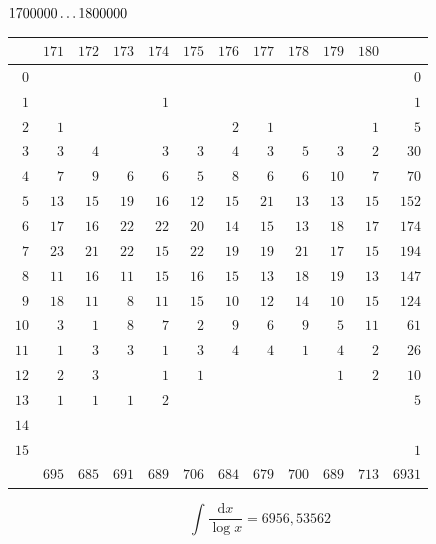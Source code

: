 \par\medskip
\noindent\begin{minipage}{\linewidth}\centering
{}
\(1700000\mathinner{.\,.\,.}1800000\)\par\smallskip
\begingroup\fontsize{10.5}{11.5}\selectfont\setlength{\tabcolsep}{3.5pt}\renewcommand{\arraystretch}{1}
\begin{tabular}{r|rrrrrrrrrr|r}\hline
 & $171$ & $172$ & $173$ & $174$ & $175$ & $176$ & $177$ & $178$ & $179$ & $180$ &  \\ \hline
$0$ &  &  &  &  &  &  &  &  &  &  & $0$ \\
$1$ &  &  &  & $1$ &  &  &  &  &  &  & $1$ \\
$2$ & $1$ &  &  &  &  & $2$ & $1$ &  &  & $1$ & $5$ \\
$3$ & $3$ & $4$ &  & $3$ & $3$ & $4$ & $3$ & $5$ & $3$ & $2$ & $30$ \\
$4$ & $7$ & $9$ & $6$ & $6$ & $5$ & $8$ & $6$ & $6$ & $10$ & $7$ & $70$ \\
$5$ & $13$ & $15$ & $19$ & $16$ & $12$ & $15$ & $21$ & $13$ & $13$ & $15$ & $152$ \\
$6$ & $17$ & $16$ & $22$ & $22$ & $20$ & $14$ & $15$ & $13$ & $18$ & $17$ & $174$ \\
$7$ & $23$ & $21$ & $22$ & $15$ & $22$ & $19$ & $19$ & $21$ & $17$ & $15$ & $194$ \\
$8$ & $11$ & $16$ & $11$ & $15$ & $16$ & $15$ & $13$ & $18$ & $19$ & $13$ & $147$ \\
$9$ & $18$ & $11$ & $8$ & $11$ & $15$ & $10$ & $12$ & $14$ & $10$ & $15$ & $124$ \\
$10$ & $3$ & $1$ & $8$ & $7$ & $2$ & $9$ & $6$ & $9$ & $5$ & $11$ & $61$ \\
$11$ & $1$ & $3$ & $3$ & $1$ & $3$ & $4$ & $4$ & $1$ & $4$ & $2$ & $26$ \\
$12$ & $2$ & $3$ &  & $1$ & $1$ &  &  &  & $1$ & $2$ & $10$ \\
$13$ & $1$ & $1$ & $1$ & $2$ &  &  &  &  &  &  & $5$ \\
$14$ &  &  &  &  &  &  &  &  &  &  &  \\
$15$ &  &  &  &  &  &  &  &  &  &  & $1$ \\
\hline
 & $695$ & $685$ & $691$ & $689$ & $706$ & $684$ & $679$ & $700$ & $689$ & $713$ & $6931$ \\ \hline
\end{tabular}\par\endgroup
\setlength{\abovedisplayskip}{6pt}\setlength{\belowdisplayskip}{4pt}
\[\int\frac{\mathrm{d}x}{\log x}=6956{,}53562\]
\end{minipage}
